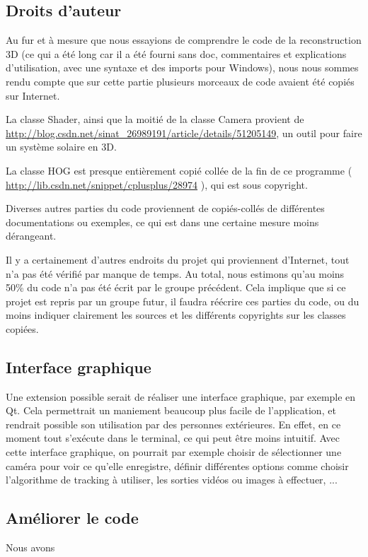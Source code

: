 \subsection{Droits d'auteur}
Au fur et à mesure que nous essayions de comprendre le code de la reconstruction 3D (ce qui a été long car il a été fourni sans doc, commentaires et explications d'utilisation, avec une syntaxe et des imports pour Windows), nous nous sommes rendu compte que sur cette partie plusieurs morceaux de code avaient été copiés sur Internet.

La classe Shader, ainsi que la moitié de la classe Camera provient de \url{http://blog.csdn.net/sinat_26989191/article/details/51205149}, un outil pour faire un système solaire en 3D.

La classe HOG est presque entièrement copié collée de la fin de ce programme ( \url{http://lib.csdn.net/snippet/cplusplus/28974} ), qui est sous copyright.

Diverses autres parties du code proviennent de copiés-collés de différentes documentations ou exemples, ce qui est dans une certaine mesure moins dé\-ran\-geant.

Il y a certainement d'autres endroits du projet qui proviennent d'Internet, tout n'a pas été vérifié par manque de temps. Au total, nous estimons qu'au moins 50\% du code n'a pas été écrit par le groupe précédent. Cela implique que si ce projet est repris par un groupe futur, il faudra réécrire ces parties du code, ou du moins indiquer clairement les sources et les différents copyrights sur les classes copiées.

\subsection{Interface graphique}

Une extension possible serait de réaliser une interface graphique, par exemple en Qt. Cela permettrait un maniement beaucoup plus facile de l'application, et rendrait possible son utilisation par des personnes extérieures. En effet, en ce moment tout s'exécute dans le terminal, ce qui peut être moins intuitif. Avec cette interface graphique, on pourrait par exemple choisir de sélectionner une caméra pour voir ce qu'elle enregistre, définir différentes options comme choisir l'algorithme de tracking à utiliser, les sorties vidéos ou images à effectuer, ...

\subsection{Améliorer le code}

Nous avons 